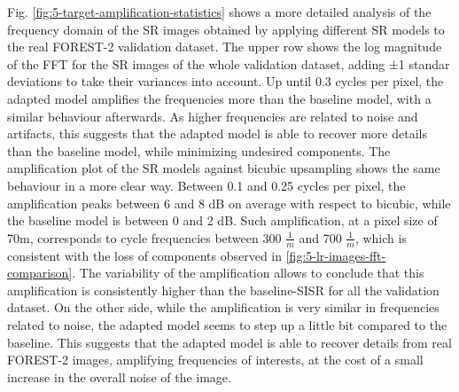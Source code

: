         Fig. \ref{fig:5-target-amplification-statistics} shows a more detailed analysis of the frequency domain of the SR images obtained by applying different SR models to the real FOREST-2 validation dataset.
        The upper row shows the log magnitude of the FFT for the SR images of the whole validation dataset, adding ±1 standar deviations to take their variances into account. 
        Up until 0.3 cycles per pixel, the adapted model amplifies the frequencies more than the baseline model, with a similar behaviour afterwards.
        As higher frequencies are related to noise and artifacts, this suggests that the adapted model is able to recover more details than the baseline model, while minimizing undesired components.
        The amplification plot of the SR models against bicubic upsampling shows the same behaviour in a more clear way. Between 0.1 and 0.25 cycles per pixel, the amplification peaks  between 6 and 8 dB on average with respect to bicubic, while the baseline model is between 0 and 2 dB.
        Such amplification, at a pixel size of 70m, corresponds to cycle frequencies between  300 $\frac{1}{m}$ and 700 $\frac{1}{m}$, which is consistent with the loss of components observed in \ref{fig:5-lr-images-fft-comparison}.
        The variability of the amplification allows to conclude that this amplification is consistently higher than the baseline-SISR for all the validation dataset.
        On the other side, while the amplification is very similar in frequencies related to noise, the adapted model seems to step up a little bit compared to the baseline.  
        This suggests that the adapted model is able to recover details from real FOREST-2 images, amplifying frequencies of interests, at the cost of a small increase in the overall noise of the image.

